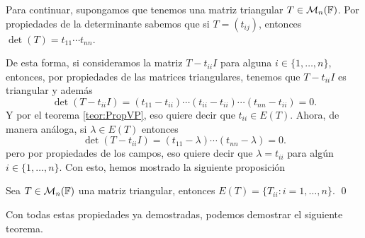 Para continuar, supongamos que tenemos una matriz triangular $T\in\mathcal{M}_n(\mathbb{F})$. Por propiedades de la determinante sabemos que si $T = (t_{ij})$, entonces $\det(T) = t_{11} \cdots t_{nn}$.

De esta forma, si consideramos la matriz $T-t_{ii}I$ para alguna $i \in \{1,\ldots,n\}$, entonces, por propiedades de las matrices triangulares, tenemos que $T-t_{ii}I$ es triangular y además
\[
  \det(T-t_{ii}I) = (t_{11}-t_{ii})\cdots(t_{ii}-t_{ii})\cdots(t_{nn}-t_{ii}) = 0.
\]
Y por el teorema \ref{teor:PropVP}, eso quiere decir que $t_{ii} \in E(T)$. Ahora, de manera análoga, si $\lambda \in E(T)$ entonces 
  \[
    \det(T-t_{ii}I) = (t_{11}-\lambda)\cdots(t_{nn}-\lambda) = 0.
  \]
pero por propiedades de los campos, eso quiere decir que $\lambda = t_{ii}$ para algún $i \in \{1,\ldots,n\}$. Con esto, hemos mostrado la siguiente proposición

\begin{prop}\label{prop:EpecTriang}
  Sea $T \in \mathcal{M}_n(\mathbb{F})$ una matriz triangular, entonces $E(T) = \{T_{ii} : i = 1,\ldots,n\}$. \qed
\end{prop}

Con todas estas propiedades ya demostradas, podemos demostrar el siguiente teorema.


